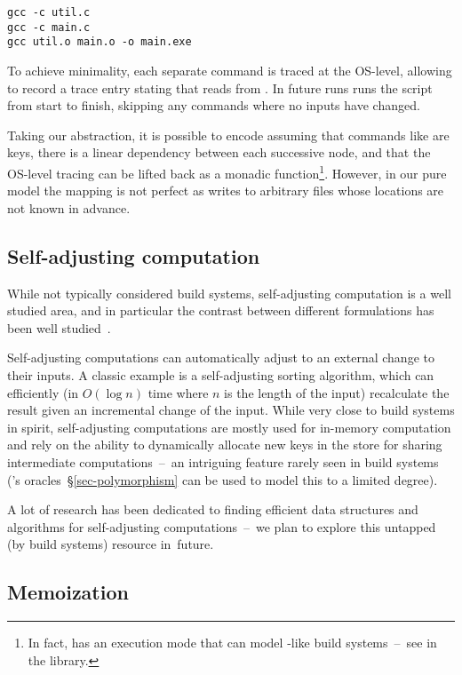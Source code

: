 \begin{verbatim}
gcc -c util.c
gcc -c main.c
gcc util.o main.o -o main.exe
\end{verbatim}

\noindent
To achieve minimality, each separate command is traced at the OS-level, allowing
\Fabricate to record a trace entry stating that  reads from
. In future runs \Fabricate runs the script from start to finish,
skipping any commands where no inputs have changed.

Taking our abstraction, it is possible to encode \Fabricate assuming that
commands like  are keys, there is a linear dependency between
each successive node, and that the OS-level tracing can be lifted back as a
monadic  function\footnote{In fact, \Shake has an execution mode that
can model \Fabricate{}-like build systems~--~see 
in the \Shake library.}. However, in our pure model the mapping is not perfect
as  writes to arbitrary files whose locations are not known in advance.

\subsection{Self-adjusting computation}

While not typically considered build systems, self-adjusting computation is a
well studied area, and in particular the contrast between different formulations
has been well studied~\cite{acar2007selfadjusting}.

Self-adjusting computations can automatically adjust to an external change
to their inputs. A classic example is a self-adjusting sorting algorithm, which
can efficiently (in $O(\log{n})$ time where $n$ is the length of the input)
recalculate the result given an incremental change of the input. While very
close to build systems in spirit, self-adjusting computations are mostly used
for in-memory computation and rely on the ability to dynamically allocate new
keys in the store for sharing intermediate computations~--~an intriguing feature
rarely seen in build systems (\Shake's oracles~\S\ref{sec-polymorphism} can be
used to model this to a limited degree).

A lot of research has been dedicated to finding efficient data structures and
algorithms for self-adjusting computations~--~we plan to explore this
untapped (by build systems) resource in~future.

\subsection{Memoization}\label{sec-related-memo}


